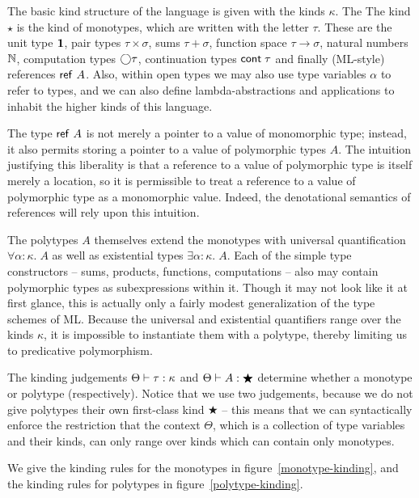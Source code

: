 The basic kind structure of the language is given with the kinds
$\kappa$. The The kind $\star$ is the kind of monotypes, which are
written with the letter $\tau$. These are the unit type $\mathbf{1}$,
pair types $\tau \times \sigma$, sums $\tau + \sigma$, function space
$\tau \to \sigma$, natural numbers $\mathbb{N}$, computation types
$\bigcirc{\tau}$, continuation types $\mbox{\textsf{{cont}}}\;{\tau}$ and finally
(ML-style) references $\mbox{\textsf{{ref }}}A$. Also, within open types we may
also use type variables $\alpha$ to refer to types, and we can also
define lambda-abstractions and applications to inhabit the higher
kinds of this language.

The type $\mbox{\textsf{{ref }}}A$ is not merely a pointer to a value of
monomorphic type; instead, it also permits storing a pointer to a
value of polymorphic types $A$. The intuition justifying this
liberality is that a reference to a value of polymorphic type is
itself merely a location, so it is permissible to treat a reference to
a value of polymorphic type as a monomorphic value. Indeed, the
denotational semantics of references will rely upon this intuition.

The polytypes $A$ themselves extend the monotypes with universal
quantification $\forall \alpha:\kappa.\;A$ as well as existential
types $\exists \alpha:\kappa.\;A$. Each of the simple type
constructors -- sums, products, functions, computations -- also may
contain polymorphic types as subexpressions within it. Though it may
not look like it at first glance, this is actually only a fairly
modest generalization of the type schemes of ML. Because the universal
and existential quantifiers range over the kinds $\kappa$, it is
impossible to instantiate them with a polytype, thereby limiting us to
predicative polymorphism.

The kinding judgements ${\Theta} \vdash {\tau} : {\kappa}$ and
${\Theta} \vdash {A} : {\bigstar}$ determine whether a monotype or polytype
(respectively). Notice that we use two judgements, because we do not
give polytypes their own first-class kind $\bigstar$ -- this means
that we can syntactically enforce the restriction that the context
$\Theta$, which is a collection of type variables and their kinds, 
can only range over kinds which can contain only monotypes. 

We give the kinding rules for the monotypes in
figure~\ref{monotype-kinding}, and the kinding rules for polytypes
in figure~\ref{polytype-kinding}. 


